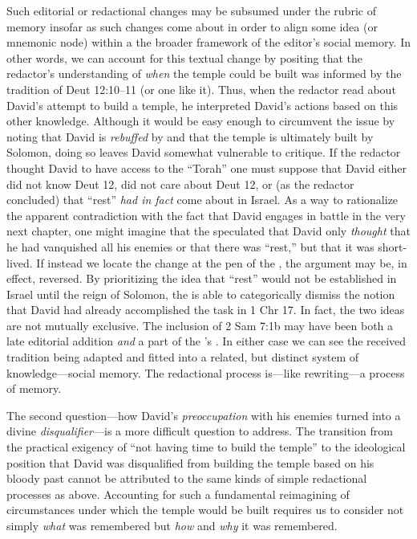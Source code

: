 Such editorial or redactional changes may be subsumed under the rubric of memory insofar as such changes come about in order to align some idea (or mnemonic node) within a the broader framework of the editor's social memory. In other words, we can account for this textual change by positing that the redactor's understanding of \emph{when} the temple could be built was informed by the tradition of Deut 12:10--11 (or one like it). Thus, when the redactor read about David's attempt to build a temple, he interpreted David's actions based on this other knowledge. Although it would be easy enough to circumvent the issue by noting that David is \emph{rebuffed} by \yahweh and that the temple is ultimately built by Solomon, doing so leaves David somewhat vulnerable to critique. If the redactor thought David to have access to the ``Torah'' one must suppose that David either did not know Deut 12, did not care about Deut 12, or (as the redactor concluded) that ``rest'' \emph{had in fact} come about in Israel. As a way to rationalize the apparent contradiction with the fact that David engages in battle in the very next chapter, one might imagine that the \chronicler speculated that David only \emph{thought} that he had vanquished all his enemies or that there was ``rest,'' but that it was short-lived. If instead we locate the change at the pen of the \chronicler, the argument may be, in effect, reversed. By prioritizing the idea that ``rest'' would not be established in Israel until the reign of Solomon, the \chronicler is able to categorically dismiss the notion that David had already accomplished the task in 1 Chr 17. In fact, the two ideas are not mutually exclusive. The inclusion of 2 Sam 7:1b may have been both a late editorial addition \emph{and} a part of the \chronicler's \vorlage. In either case we can see the received tradition being adapted and fitted into a related, but distinct system of knowledge---social memory. The redactional process is---like rewriting---a process of memory.

The second question---how David's \emph{preoccupation} with his enemies turned into a divine \emph{disqualifier}---is a more difficult question to address. The transition from the practical exigency of ``not having time to build the temple'' to the ideological position that David was disqualified from building the temple based on his bloody past cannot be attributed to the same kinds of simple redactional processes as above. Accounting for such a fundamental reimagining of circumstances under which the temple would be built requires us to consider not simply \emph{what} was remembered but \emph{how} and \emph{why} it was remembered. 

